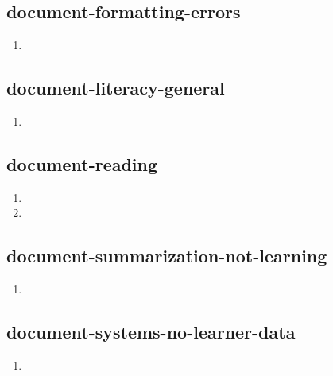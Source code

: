 \documentclass{article}
\begin{document}
\subsection{document-formatting-errors}
\begin{enumerate}
\item {}
\end{enumerate}

\subsection{document-literacy-general}
\begin{enumerate}
\item {}
\end{enumerate}

\subsection{document-reading}
\begin{enumerate}
\item {}
\item {}
\end{enumerate}

\subsection{document-summarization-not-learning}
\begin{enumerate}
\item {}
\end{enumerate}

\subsection{document-systems-no-learner-data}
\begin{enumerate}
\item {}
\end{enumerate}
\end{document}
